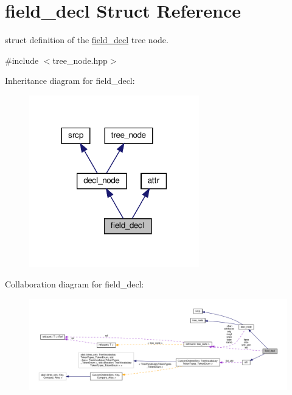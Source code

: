 \hypertarget{structfield__decl}{}\section{field\+\_\+decl Struct Reference}
\label{structfield__decl}


struct definition of the \hyperlink{structfield__decl}{field\+\_\+decl} tree node.  




{\ttfamily \#include $<$tree\+\_\+node.\+hpp$>$}



Inheritance diagram for field\+\_\+decl\+:
\nopagebreak
\begin{figure}[H]
\begin{center}
\leavevmode
\includegraphics[width=209pt]{d9/d86/structfield__decl__inherit__graph}
\end{center}
\end{figure}


Collaboration diagram for field\+\_\+decl\+:
\nopagebreak
\begin{figure}[H]
\begin{center}
\leavevmode
\includegraphics[width=350pt]{d0/d99/structfield__decl__coll__graph}
\end{center}
\end{figure}
